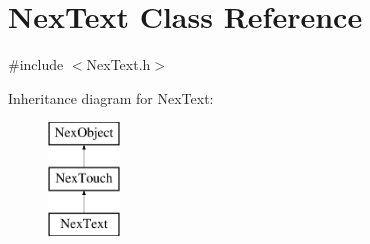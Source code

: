 \hypertarget{class_nex_text}{\section{Nex\+Text Class Reference}
\label{class_nex_text}
}


{\ttfamily \#include $<$Nex\+Text.\+h$>$}

Inheritance diagram for Nex\+Text\+:\begin{figure}[H]
\begin{center}
\leavevmode
\includegraphics[height=3.000000cm]{class_nex_text}
\end{center}
\end{figure}
